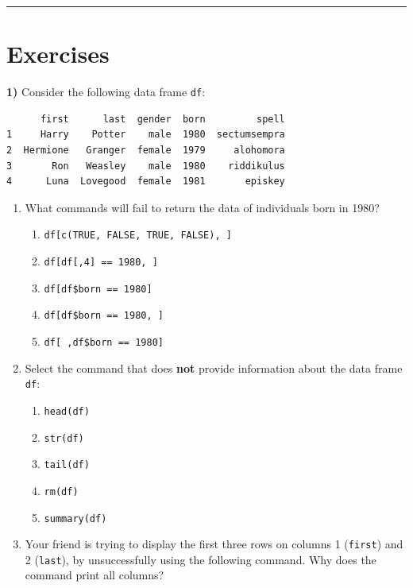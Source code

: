 \documentclass[
]{book}
\begin{document}
\begin{center}\rule{0.5\linewidth}{0.5pt}\end{center}

\hypertarget{exercises-5}{%
\section{Exercises}\label{exercises-5}}

\textbf{1)} Consider the following data frame \texttt{df}:

\begin{verbatim}
      first      last  gender  born         spell
1     Harry    Potter    male  1980  sectumsempra
2  Hermione   Granger  female  1979     alohomora
3       Ron   Weasley    male  1980    riddikulus
4      Luna  Lovegood  female  1981       episkey
\end{verbatim}

\begin{enumerate}
\def\labelenumi{\alph{enumi})}
\item
  What commands will fail to return the data of individuals born in 1980?

  \begin{enumerate}
  \def\labelenumii{\roman{enumii})}
  \item
    \texttt{df{[}c(TRUE,\ FALSE,\ TRUE,\ FALSE),\ {]}}
  \item
    \texttt{df{[}df{[},4{]}\ ==\ 1980,\ {]}}
  \item
    \texttt{df{[}df\$born\ ==\ 1980{]}}
  \item
    \texttt{df{[}df\$born\ ==\ 1980,\ {]}}
  \item
    \texttt{df{[}\ ,df\$born\ ==\ 1980{]}}
  \end{enumerate}
\item
  Select the command that does \textbf{not} provide information about the data
  frame \texttt{df}:

  \begin{enumerate}
  \def\labelenumii{\roman{enumii})}
  \item
    \texttt{head(df)}
  \item
    \texttt{str(df)}
  \item
    \texttt{tail(df)}
  \item
    \texttt{rm(df)}
  \item
    \texttt{summary(df)}
  \end{enumerate}
\item
  Your friend is trying to display the first three rows on columns 1 (\texttt{first})
  and 2 (\texttt{last}), by unsuccessfully using the following command.
  Why does the command print all columns?
\end{enumerate}
\end{document}
